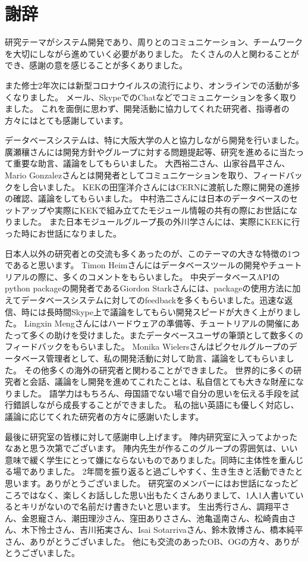 
%
%
\chapter*{謝辞}
研究テーマがシステム開発であり、周りとのコミュニケーション、チームワークを大切にしながら進めていく必要がありました。
たくさんの人と関わることができ、感謝の意を感じることが多くありました。

また修士2年次には新型コロナウイルスの流行により、オンラインでの活動が多くなりました。
メール、SkypeでのChatなどでコミュニケーションを多く取りました。
これを面倒に思わず、開発活動に協力してくれた研究者、指導者の方々にはとても感謝しています。

データベースシステムは、特に大阪大学の人と協力しながら開発を行いました。
廣瀬穰さんには開発方針やグループに対する問題提起等、研究を進めるに当たって重要な助言、議論をしてもらいました。
大西裕二さん、山家谷昌平さん、Mario Gonzalezさんとは開発者としてコミュニケーションを取り、フィードバックをし合いました。
KEKの田窪洋介さんにはCERNに渡航した際に開発の進捗の確認、議論をしてもらいました。
中村浩二さんには日本のデータベースのセットアップや実際にKEKで組み立てたモジュール情報の共有の際にお世話になりました。
また日本モジュールグループ長の外川学さんには、実際にKEKに行った時にお世話になりました。

日本人以外の研究者との交流も多くあったのが、このテーマの大きな特徴の1つであると思います。
Timon Heimさんにはデータベースツールの開発やチュートリアルの際に、多くのコメントをもらいました。
中央データベースAPIのpython packageの開発者であるGiordon Starkさんには、packageの使用方法に加えてデータベースシステムに対してのfeedbackを多くもらいました。迅速な返信、時には長時間Skype上で議論をしてもらい開発スピードが大きく上がりました。
Lingxin Mengさんにはハードウェアの準備等、チュートリアルの開催にあたって多くの助けを受けました。またデータベースユーザの筆頭として数多くのフィードバックをもらいました。
Monika Wielersさんはピクセルグループのデータベース管理者として、私の開発活動に対して助言、議論をしてもらいました。
その他多くの海外の研究者と関わることができました。
世界的に多くの研究者と会話、議論をし開発を進めてこれたことは、私自信とても大きな財産になりました。
語学力はもちろん、母国語でない場で自分の思いを伝える手段を試行錯誤しながら成長することができました。
私の拙い英語にも優しく対応し、議論に応じてくれた研究者の方々に感謝いたします。

最後に研究室の皆様に対して感謝申し上げます。
陣内研究室に入ってよかったなあと思う次第でございます。
陣内先生が作るこのグループの雰囲気は、いい意味で緩く学生にとって嫌にならないものでありました。同時に主体性を重んじる場でありました。
2年間を振り返ると過ごしやすく、生き生きと活動できたと思います。ありがとうございました。
研究室のメンバーにはお世話になったどころではなく、楽しくお話しした思い出もたくさんありまして、1人1人書いているとキリがないので名前だけ書きたいと思います。
生出秀行さん、調翔平さん、金恩寵さん、潮田理沙さん、窪田ありささん、池亀遥南さん、松崎貴由さん、木下怜士さん、吉川拓実さん、Isai Sotarrivaさん、鈴木敦博さん、橋本純平さん、ありがとうございました。
他にも交流のあったOB、OGの方々、ありがとうございました。


%
%
\listoffigures
\listoftables

\newpage
\printindex
%
%

